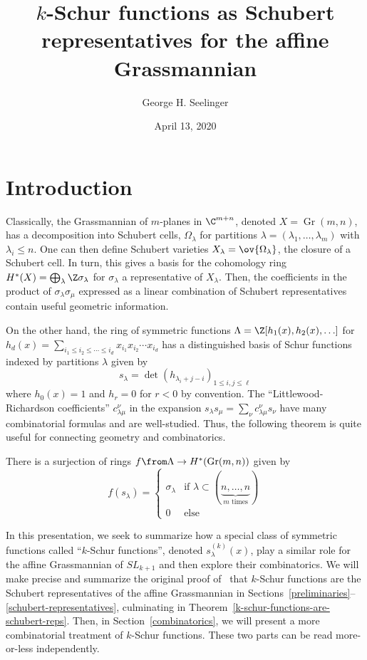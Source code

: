 \documentclass[11pt,leqno,oneside]{amsart}
\title[\(k\)-Schur functions]{\(k\)-Schur functions as Schubert
  representatives for the affine Grassmannian}
\author{George H. Seelinger}
\date{April 13, 2020}
\numberwithin{thm}{section}
\newcommand{\Gr}{\operatorname{Gr}}
\newcommand{\sym}{\Lambda}
\begin{document}
\maketitle
\section{Introduction}
Classically, the Grassmannian of \(m\)-planes in \(\C^{m+n}\), denoted
\(X = \Gr(m,n)\), has a decomposition into Schubert cells,
\(\Omega_\lambda\) for partitions \(\lambda = (\lambda_1, \ldots,
\lambda_m)\) with \(\lambda_i \leq n\). One can then define Schubert varieties
\(X_\lambda = \ov{\Omega_\lambda}\), the closure of a Schubert
cell. In turn, this gives a basis 
for the cohomology ring \(H^*(X) = \bigoplus_\lambda \Z
\sigma_\lambda\) for \(\sigma_\lambda\) a representative of
\(X_\lambda\). Then, the coefficients in the product of
\(\sigma_\lambda \sigma_\mu\) expressed as 
a linear combination of Schubert representatives contain useful
geometric information.

On the other hand, the ring of symmetric functions \(\sym = \Z[
h_1(x), h_2(x), \ldots]\) for \(h_d(x) = \sum_{i_1 \leq i_2 \leq \cdots \leq
  i_d} x_{i_1} x_{i_2} \cdots x_{i_d}\) has a distinguished basis of
Schur functions indexed by partitions \(\lambda\) given by \[
  s_\lambda = \det(h_{\lambda_i+j-i})_{1 \leq i,j \leq \ell}
\]
where \(h_0(x) = 1\) and \(h_r = 0\) for \(r < 0\) by convention. The
``Littlewood-Richardson coefficients''
\(c_{\lambda \mu}^\nu\) in the expansion \(s_\lambda s_\mu = \sum_\nu
c_{\lambda \mu}^\nu s_\nu\) have many combinatorial formulas and are
well-studied. Thus, the following theorem is quite useful for
connecting geometry and combinatorics.
\begin{thm}
  There is a surjection of rings \(f \from \sym \to H^*(\Gr(m,n))\)
  given by \[
    f(s_\lambda) =
    \begin{cases}
      \sigma_\lambda & \text{if }\lambda \subset (\underbrace{n,
        \ldots, n}_{m \text{ times}}) \\
      0 & \text{else}
    \end{cases}
  \]
\end{thm}
In this presentation, we seek to summarize how a special class of
symmetric functions called ``\(k\)-Schur functions'', denoted
\(s_\lambda^{(k)}(x)\), play a similar role for the affine Grassmannian
of \(SL_{k+1}\) and then explore their combinatorics. We will make
precise and summarize the
original proof of~\cite{lam} that \(k\)-Schur functions are the
Schubert representatives of the affine Grassmannian in
Sections~\ref{preliminaries}--\ref{schubert-representatives},
culminating in Theorem~\ref{k-schur-functions-are-schubert-reps}. Then, in
Section~\ref{combinatorics}, we will present a more combinatorial
treatment of \(k\)-Schur functions. These two parts can be read
more-or-less independently.
\end{document}

